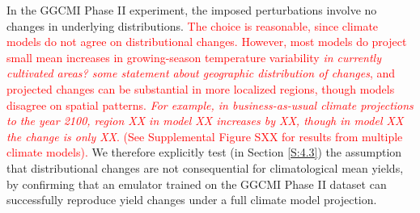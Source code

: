 \documentclass[gmd, manuscript]{copernicus} %
\begin{document}
In the GGCMI Phase II experiment, the imposed perturbations involve no changes in underlying distributions. %
\textcolor{red}{The choice is reasonable, since
climate models do not agree on distributional changes. %
However, most models do project small mean increases in growing-season temperature variability \textit{in currently cultivated areas? some statement about geographic distribution of changes}, and projected changes can be substantial in more localized regions, though models disagree on spatial patterns.  \textit{For example, in business-as-usual climate projections to the year 2100, region XX in model XX increases by XX, though in model XX the change is only XX}. (See Supplemental Figure SXX for results from multiple climate models).}
We therefore explicitly test (in Section \ref{S:4.3}) the assumption that distributional changes are not consequential for climatological mean yields,  %
by confirming that an emulator trained on the GGCMI Phase II dataset can successfully reproduce yield changes under a full climate model projection.
\end{document}
